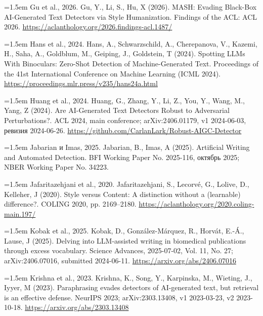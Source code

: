 \documentclass[11pt,a4paper]{article}
\renewcommand{\_}{\textunderscore\allowbreak}
\begin{document}
\noindent\hangindent=1.5em Gu et al., 2026. Gu, Y., Li, S., Hu, X (2026). MASH: Evading Black-Box AI-Generated Text Detectors via Style Humanization. Findings of the ACL: ACL 2026. \url{https://aclanthology.org/2026.findings-acl.1487/}\par\smallskip

\noindent\hangindent=1.5em Hans et al., 2024. Hans, A., Schwarzschild, A., Cherepanova, V., Kazemi, H., Saha, A., Goldblum, M., Geiping, J., Goldstein, T (2024). Spotting LLMs With Binoculars: Zero-Shot Detection of Machine-Generated Text. Proceedings of the 41st International Conference on Machine Learning (ICML 2024). \url{https://proceedings.mlr.press/v235/hans24a.html}\par\smallskip

\noindent\hangindent=1.5em Huang et al., 2024. Huang, G., Zhang, Y., Li, Z., You, Y., Wang, M., Yang, Z (2024). Are AI-Generated Text Detectors Robust to Adversarial Perturbations?. ACL 2024, main conference; arXiv:2406.01179, v1 2024-06-03, ревизия 2024-06-26. \url{https://github.com/CarlanLark/Robust-AIGC-Detector}\par\smallskip

\noindent\hangindent=1.5em Jabarian и Imas, 2025. Jabarian, B., Imas, A (2025). Artificial Writing and Automated Detection. BFI Working Paper No. 2025-116, октябрь 2025; NBER Working Paper No. 34223.\par\smallskip

\noindent\hangindent=1.5em Jafaritazehjani et al., 2020. Jafaritazehjani, S., Lecorv\'e, G., Lolive, D., Kelleher, J (2020). Style versus Content: A distinction without a (learnable) difference?. COLING 2020, pp. 2169–2180. \url{https://aclanthology.org/2020.coling-main.197/}\par\smallskip

\noindent\hangindent=1.5em Kobak et al., 2025. Kobak, D., Gonz\'alez-M\'arquez, R., Horv\'at, E.-\'A., Lause, J (2025). Delving into LLM-assisted writing in biomedical publications through excess vocabulary. Science Advances, 2025-07-02, Vol. 11, No. 27; arXiv:2406.07016, submitted 2024-06-11. \url{https://arxiv.org/abs/2406.07016}\par\smallskip

\noindent\hangindent=1.5em Krishna et al., 2023. Krishna, K., Song, Y., Karpinska, M., Wieting, J., Iyyer, M (2023). Paraphrasing evades detectors of AI-generated text, but retrieval is an effective defense. NeurIPS 2023; arXiv:2303.13408, v1 2023-03-23, v2 2023-10-18. \url{https://arxiv.org/abs/2303.13408}\par\smallskip
\end{document}
